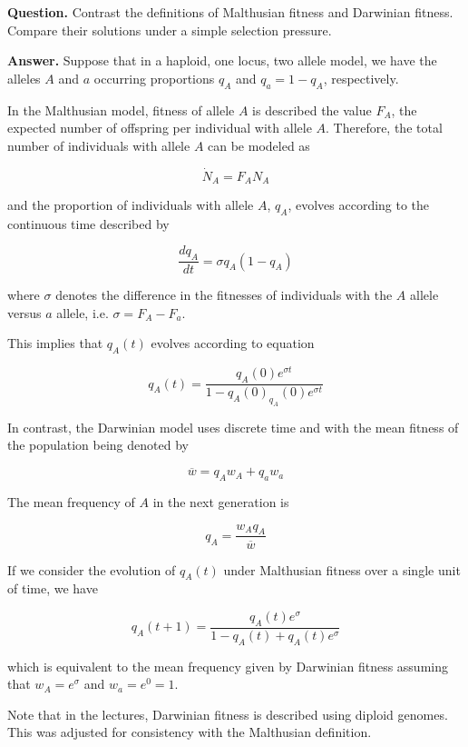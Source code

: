 \textbf{Question.} Contrast the definitions of Malthusian fitness and Darwinian fitness. Compare their solutions under a simple selection pressure.
	
	\textbf{Answer.} Suppose that in a haploid, one locus, two allele model, we have the alleles $A$ and $a$ occurring proportions $q_A$ and $q_a = 1-q_A$, respectively.

In the Malthusian model, fitness of allele $A$ is described the value $F_A$, the expected number of offspring per individual with allele $A$. Therefore, the total number of individuals with allele $A$ can be modeled as 

\[\dot{N}_A = F_AN_A\]

and the proportion of individuals with allele $A$, $q_A$, evolves according to the continuous time described by

\[\frac{dq_A}{dt} = \sigma q_A (1-q_A)\]

where $\sigma$ denotes the difference in the fitnesses of individuals with the $A$ allele versus $a$ allele, i.e. $\sigma = F_A - F_a$. 

This implies that $q_A(t)$ evolves according to equation

\[q_A(t) = \frac{q_A(0) e^{\sigma t}}{1-q_A(0)_q_A(0)e^{\sigma t}}\]

In contrast, the Darwinian model uses discrete time and with the mean fitness of the population being denoted by

\[\overline{w} = q_{A}w_{A} + q_{a}w_{a}\]

The mean frequency of $A$ in the next generation is

\[q_A = \frac{w_{A}q_{A}}{\overline{w}}\]

If we consider the evolution of $q_A(t)$ under Malthusian fitness over a single unit of time, we have

\[q_A(t+1) = \frac{q_A(t)e^{\sigma}}{1-q_A(t)+q_A(t)e^{\sigma}}\]

which is equivalent to the mean frequency given by Darwinian fitness assuming that $w_A = e^\sigma$ and $w_a = e^0 =1$.

Note that in the lectures, Darwinian fitness is described using diploid genomes. This was adjusted for consistency with the Malthusian definition.
